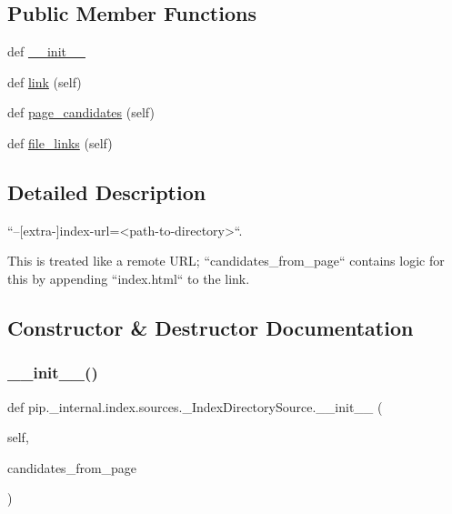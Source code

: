 \subsection*{Public Member Functions}
\begin{DoxyCompactItemize}
\item 
def \hyperlink{classpip_1_1__internal_1_1index_1_1sources_1_1__IndexDirectorySource_ac096167a5a2143e77ba9fb1e44a08d47}{\+\_\+\+\_\+init\+\_\+\+\_\+}
\item 
def \hyperlink{classpip_1_1__internal_1_1index_1_1sources_1_1__IndexDirectorySource_aa0f714ec88cb03799be7b6cb756a6808}{link} (self)
\item 
def \hyperlink{classpip_1_1__internal_1_1index_1_1sources_1_1__IndexDirectorySource_a6e9e0eda2dc96df1aa08017a115816e6}{page\+\_\+candidates} (self)
\item 
def \hyperlink{classpip_1_1__internal_1_1index_1_1sources_1_1__IndexDirectorySource_acc9e4809f1000a11780410339004bcf1}{file\+\_\+links} (self)
\end{DoxyCompactItemize}


\subsection{Detailed Description}
\begin{DoxyVerb}``--[extra-]index-url=<path-to-directory>``.

This is treated like a remote URL; ``candidates_from_page`` contains logic
for this by appending ``index.html`` to the link.
\end{DoxyVerb}
 

\subsection{Constructor \& Destructor Documentation}
\mbox{\label{classpip_1_1__internal_1_1index_1_1sources_1_1__IndexDirectorySource_ac096167a5a2143e77ba9fb1e44a08d47}} 
\subsubsection{\texorpdfstring{\+\_\+\+\_\+init\+\_\+\+\_\+()}{\_\_init\_\_()}}
{\footnotesize\ttfamily def pip.\+\_\+internal.\+index.\+sources.\+\_\+\+Index\+Directory\+Source.\+\_\+\+\_\+init\+\_\+\+\_\+ (\begin{DoxyParamCaption}\item[{}]{self,  }\item[{}]{candidates\+\_\+from\+\_\+page }\end{DoxyParamCaption})}



